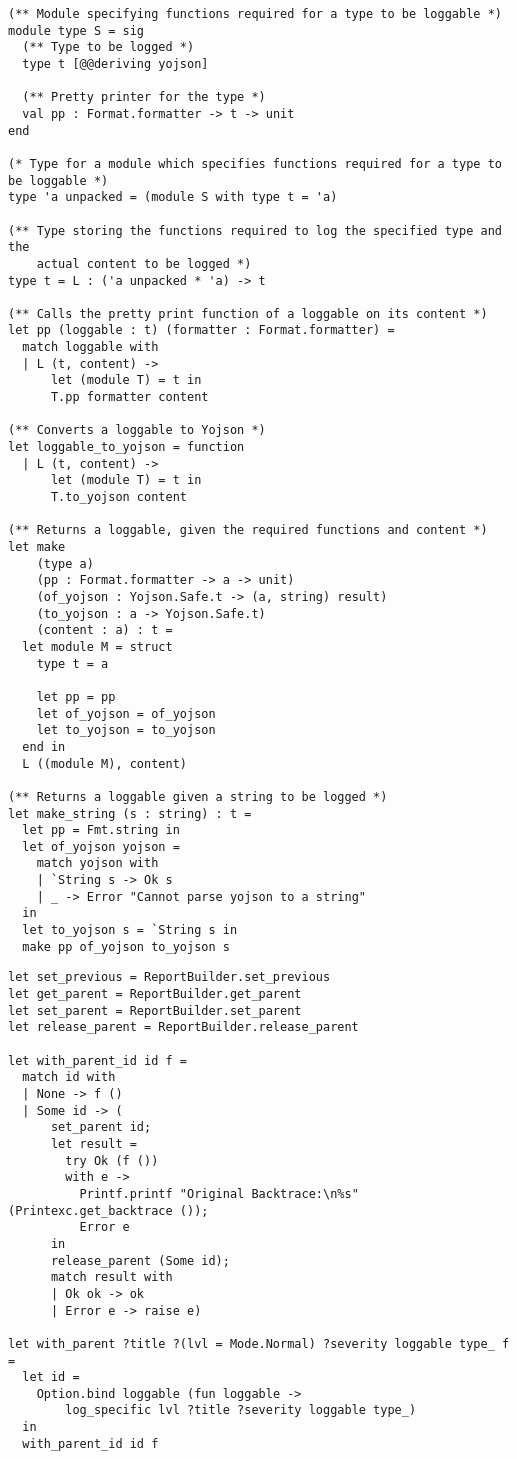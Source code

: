 \begin{lstlisting}[caption={
  The \texttt{Loggable} module
  \label{lst:loggable}}, style=code]
(** Module specifying functions required for a type to be loggable *)
module type S = sig
  (** Type to be logged *)
  type t [@@deriving yojson]

  (** Pretty printer for the type *)
  val pp : Format.formatter -> t -> unit
end

(* Type for a module which specifies functions required for a type to be loggable *)
type 'a unpacked = (module S with type t = 'a)

(** Type storing the functions required to log the specified type and the
    actual content to be logged *)
type t = L : ('a unpacked * 'a) -> t

(** Calls the pretty print function of a loggable on its content *)
let pp (loggable : t) (formatter : Format.formatter) =
  match loggable with
  | L (t, content) ->
      let (module T) = t in
      T.pp formatter content

(** Converts a loggable to Yojson *)
let loggable_to_yojson = function
  | L (t, content) ->
      let (module T) = t in
      T.to_yojson content

(** Returns a loggable, given the required functions and content *)
let make
    (type a)
    (pp : Format.formatter -> a -> unit)
    (of_yojson : Yojson.Safe.t -> (a, string) result)
    (to_yojson : a -> Yojson.Safe.t)
    (content : a) : t =
  let module M = struct
    type t = a

    let pp = pp
    let of_yojson = of_yojson
    let to_yojson = to_yojson
  end in
  L ((module M), content)

(** Returns a loggable given a string to be logged *)
let make_string (s : string) : t =
  let pp = Fmt.string in
  let of_yojson yojson =
    match yojson with
    | `String s -> Ok s
    | _ -> Error "Cannot parse yojson to a string"
  in
  let to_yojson s = `String s in
  make pp of_yojson to_yojson s
\end{lstlisting}

\begin{lstlisting}[caption={
  Exerpt from the \texttt{Logging} module, showing the new functions for
  controlling the parent and previous report IDs
  \label{lst:logging-parent-previous}}, style=code]
let set_previous = ReportBuilder.set_previous
let get_parent = ReportBuilder.get_parent
let set_parent = ReportBuilder.set_parent
let release_parent = ReportBuilder.release_parent

let with_parent_id id f =
  match id with
  | None -> f ()
  | Some id -> (
      set_parent id;
      let result =
        try Ok (f ())
        with e ->
          Printf.printf "Original Backtrace:\n%s" (Printexc.get_backtrace ());
          Error e
      in
      release_parent (Some id);
      match result with
      | Ok ok -> ok
      | Error e -> raise e)

let with_parent ?title ?(lvl = Mode.Normal) ?severity loggable type_ f =
  let id =
    Option.bind loggable (fun loggable ->
        log_specific lvl ?title ?severity loggable type_)
  in
  with_parent_id id f
\end{lstlisting}

